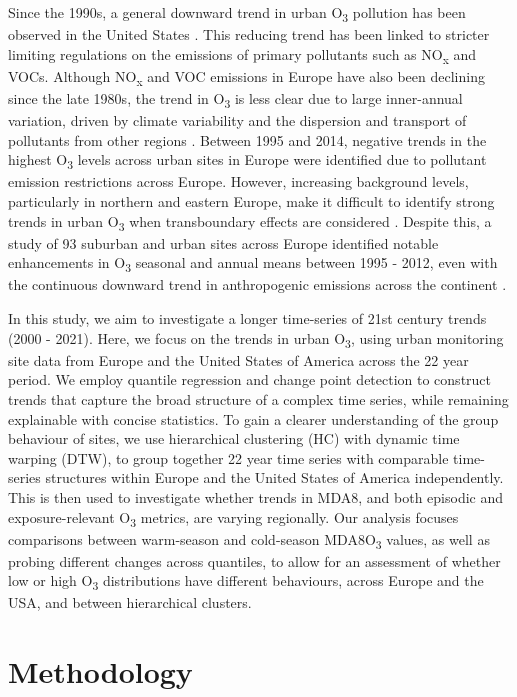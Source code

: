 \documentclass[journal abbreviation, manuscript]{copernicus}
\begin{document}
Since the 1990s, a general downward trend in urban O\textsubscript{3} pollution has been observed in the United States \citep{acp-20-3191-2020}. This reducing trend has been linked to stricter limiting regulations on the emissions of primary pollutants such as NO\textsubscript{x} and VOCs. Although NO\textsubscript{x} and VOC emissions in Europe have also been declining since the late 1980s, the trend in O\textsubscript{3} is less clear due to large inner-annual variation, driven by climate variability and the dispersion and transport of pollutants from other regions \citep{acp-6-51-2006, acp-18-5589-2018}. Between 1995 and 2014, negative trends in the highest O\textsubscript{3} levels across urban sites in Europe were identified due to pollutant emission restrictions across Europe. However, increasing background levels, particularly in northern and eastern Europe, make it difficult to identify strong trends in urban O\textsubscript{3} when transboundary effects are considered \citep{acp-18-5589-2018}. Despite this, a study of 93 suburban and urban sites across Europe identified notable enhancements in O\textsubscript{3} seasonal and annual means between 1995 - 2012, even with the continuous downward trend in anthropogenic emissions across the continent \citep{acp-18-5589-2018}.

In this study, we aim to investigate a longer time-series of 21st century trends (2000 - 2021). Here, we focus on the trends in urban O\textsubscript{3}, using urban monitoring site data from Europe and the United States of America across the 22 year period. We employ quantile regression and change point detection to construct trends that capture the broad structure of a complex time series, while remaining explainable with concise statistics. To gain a clearer understanding of the group behaviour of sites, we use hierarchical clustering (HC) with dynamic time warping (DTW), to group together 22 year time series with comparable time-series structures within Europe and the United States of America independently. This is then used to investigate whether trends in MDA8, and both episodic and exposure-relevant O\textsubscript{3} metrics, are varying regionally. Our analysis focuses comparisons between warm-season and cold-season MDA8O\textsubscript{3} values, as well as probing different changes across quantiles, to allow for an assessment of whether low or high O\textsubscript{3} distributions have different behaviours, across Europe and the USA, and between hierarchical clusters.

\section{Methodology} \label{sect:method}
\end{document}
